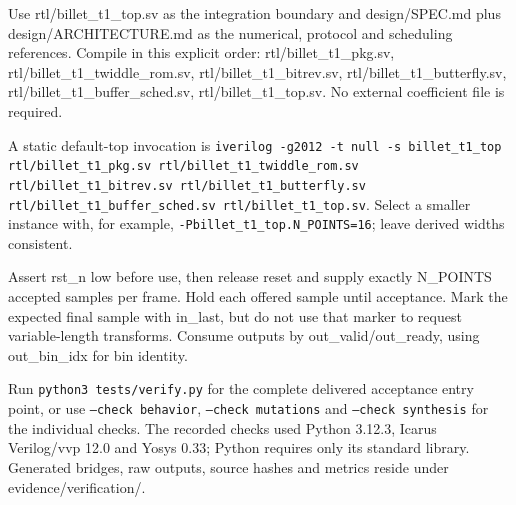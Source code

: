 \documentclass[11pt,a4paper]{article}
\begin{document}
Use rtl/\allowbreak{}billet\_\allowbreak{}t1\_\allowbreak{}top.sv as the integration boundary and design/\allowbreak{}SPEC.md plus design/\allowbreak{}ARCHITECTURE.md as the numerical,\allowbreak{} protocol and scheduling references. Compile in this explicit order: rtl/\allowbreak{}billet\_\allowbreak{}t1\_\allowbreak{}pkg.sv,\allowbreak{} rtl/\allowbreak{}billet\_\allowbreak{}t1\_\allowbreak{}twiddle\_\allowbreak{}rom.sv,\allowbreak{} rtl/\allowbreak{}billet\_\allowbreak{}t1\_\allowbreak{}bitrev.sv,\allowbreak{} rtl/\allowbreak{}billet\_\allowbreak{}t1\_\allowbreak{}butterfly.sv,\allowbreak{} rtl/\allowbreak{}billet\_\allowbreak{}t1\_\allowbreak{}buffer\_\allowbreak{}sched.sv,\allowbreak{} rtl/\allowbreak{}billet\_\allowbreak{}t1\_\allowbreak{}top.sv. No external coefficient file is required.


A static default-top invocation is \texttt{iverilog -g2012 -t null -s billet\_\allowbreak{}t1\_\allowbreak{}top rtl/\allowbreak{}billet\_\allowbreak{}t1\_\allowbreak{}pkg.sv rtl/\allowbreak{}billet\_\allowbreak{}t1\_\allowbreak{}twiddle\_\allowbreak{}rom.sv rtl/\allowbreak{}billet\_\allowbreak{}t1\_\allowbreak{}bitrev.sv rtl/\allowbreak{}billet\_\allowbreak{}t1\_\allowbreak{}butterfly.sv rtl/\allowbreak{}billet\_\allowbreak{}t1\_\allowbreak{}buffer\_\allowbreak{}sched.sv rtl/\allowbreak{}billet\_\allowbreak{}t1\_\allowbreak{}top.sv}. Select a smaller instance with,\allowbreak{} for example,\allowbreak{} \texttt{-Pbillet\_\allowbreak{}t1\_\allowbreak{}top.N\_\allowbreak{}POINTS=\allowbreak{}16}; leave derived widths consistent.


Assert rst\_\allowbreak{}n low before use,\allowbreak{} then release reset and supply exactly N\_\allowbreak{}POINTS accepted samples per frame. Hold each offered sample until acceptance. Mark the expected final sample with in\_\allowbreak{}last,\allowbreak{} but do not use that marker to request variable-length transforms. Consume outputs by out\_\allowbreak{}valid/\allowbreak{}out\_\allowbreak{}ready,\allowbreak{} using out\_\allowbreak{}bin\_\allowbreak{}idx for bin identity.


Run \texttt{python3 tests/\allowbreak{}verify.py} for the complete delivered acceptance entry point,\allowbreak{} or use \texttt{--check behavior},\allowbreak{} \texttt{--check mutations} and \texttt{--check synthesis} for the individual checks. The recorded checks used Python 3.12.3,\allowbreak{} Icarus Verilog/\allowbreak{}vvp 12.0 and Yosys 0.33; Python requires only its standard library. Generated bridges,\allowbreak{} raw outputs,\allowbreak{} source hashes and metrics reside under evidence/\allowbreak{}verification/\allowbreak{}.
\end{document}

